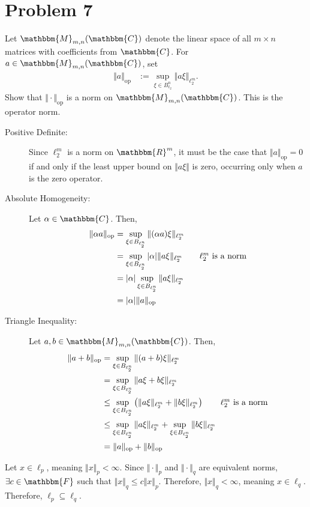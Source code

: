 \documentclass[10pt]{extarticle}
\newcommand{\R}{\mathbbm{R}}
\begin{document}
  \section{Problem 7}%
  Let $\mathbbm{M}_{m,n}(\mathbbm{C})$ denote the linear space of all $m\times n$ matrices with coefficients from $\mathbbm{C}$. For $a\in \mathbbm{M}_{m,n}(\mathbbm{C})$, set
  \begin{align*}
    \Vert a\Vert_{\text{op}} &:= \sup_{\xi\in B_{\ell_2}^n}\Vert a\xi\Vert_{\ell_2^{m}}.
  \end{align*}
  Show that $\Vert \cdot \Vert_{\text{op}}$ is a norm on $\mathbbm{M}_{m,n}(\mathbbm{C})$. This is the operator norm.
  \begin{description}
    \item[Positive Definite:] Since $\ell_{2}^{m}$ is a norm on $\R^m$, it must be the case that $\Vert a\Vert_{\text{op}} = 0$ if and only if the least upper bound on $\Vert a\xi\Vert$ is zero, occurring only when $a$ is the zero operator.
    \item[Absolute Homogeneity:] Let $\alpha\in \mathbbm{C}$. Then,
      \begin{align*}
        \Vert \alpha a \Vert_{\text{op}} &= \sup_{\xi\in B_{\ell_2^{n}}}\Vert (\alpha a)\xi\Vert_{\ell_{2}^{m}}\\
                                         &= \sup_{\xi\in B_{\ell_{2}^{n}}}|\alpha|\Vert a \xi \Vert_{\ell_{2}^{m}}\tag*{$\ell_{2}^{m}$ is a norm}\\
                                         &= |\alpha|\sup_{\xi\in B_{\ell_2^{n}}}\Vert a \xi\Vert_{\ell_{2}^{m}}\\
                                         &= |\alpha|\Vert a \Vert_{\text{op}}
      \end{align*}
    \item[Triangle Inequality:] Let $a,b \in \mathbbm{M}_{m,n}(\mathbbm{C})$. Then,
      \begin{align*}
        \Vert a + b \Vert_{\text{op}} &= \sup_{\xi\in B_{\ell_{2}^{n}}} \Vert (a+b)\xi\Vert_{\ell_{2}^{m}}\\
                                      &= \sup_{\xi \in B_{\ell_{2}^{n}}} \Vert a\xi + b\xi\Vert_{\ell_2^{m}}\\
                                      &\leq \sup_{\xi\in B_{\ell_2^{n}}} \left(\Vert a\xi\Vert_{\ell_{2}^{m}} + \Vert b\xi\Vert_{\ell_{2}^{m}}\right)\tag*{$\ell_{2}^{m}$ is a norm}\\
                                      &\leq \sup_{\xi\in B_{\ell_{2}^{n}}}\Vert a\xi\Vert_{\ell_{2}^{m}} + \sup_{\xi\in B_{\ell_{2}^{n}}} \Vert b\xi \Vert_{\ell_{2}^{m}}\\
                                      &= \Vert a\Vert_{\text{op}} + \Vert b \Vert_{\text{op}}
      \end{align*}
  \end{description}
  Let $x\in \ell_{p}$, meaning $\Vert x \Vert_p < \infty$. Since $\Vert \cdot \Vert_{p}$ and $\Vert \cdot \Vert_q$ are equivalent norms, $\exists c\in \mathbbm{F}$ such that $\Vert x \Vert_{q} \leq c\Vert x \Vert_{p}$. Therefore, $\Vert x \Vert_{q} < \infty$, meaning $x\in \ell_{q}$. Therefore, $\ell_{p} \subseteq \ell_{q}$.
\end{document}

